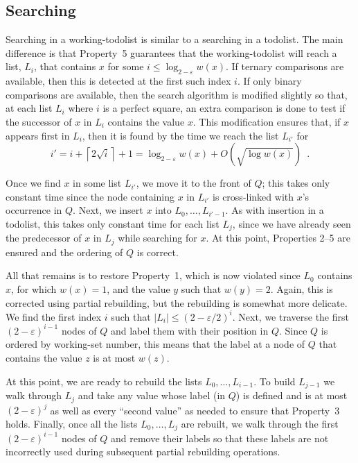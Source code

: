 \documentclass{patmorin}
\newcommand{\eps}{\varepsilon}
\begin{document}
\subsection{Searching}

Searching in a working-todolist is similar to a searching in a todolist.
The main
difference is that Property~5 guarantees that the working-todolist will reach
a list, $L_i$, that contains $x$ for some $i\le\log_{2-\eps} w(x)$.
If ternary comparisons are available, then this is detected at the
first such index $i$.  If only binary comparisons are available, then
the search algorithm is modified slightly so that, at each list $L_i$
where $i$ is a perfect square, an extra comparison is done to test if
the successor of $x$ in $L_i$ contains the value $x$.  This modification
ensures that, if $x$ appears first in $L_i$, then it is found by the
time we reach the list $L_{i'}$ for
\[
     i'=i+\left\lceil 2\sqrt{i}\right\rceil + 1 = \log_{2-\eps} w(x) + O(\sqrt{\log w(x)}) \enspace .
\]

Once we find $x$ in some list $L_{i'}$, we move it to the front of $Q$;
this takes only constant time since the node containing $x$ in $L_{i'}$
is cross-linked with $x$'s occurrence in $Q$.  Next, we insert $x$ into
$L_0,\ldots,L_{i'-1}$.  As with insertion in a todolist, this takes only
constant time for each list $L_j$, since we have already seen the predecessor
of $x$ in $L_j$ while searching for $x$.  
At this point, Properties 2--5 are ensured and the ordering of $Q$ is
correct.  

All that remains is to restore Property~1, which is now violated
since $L_0$ contains $x$, for which $w(x)=1$, and the value $y$ such
that $w(y)=2$.  Again, this is corrected using partial rebuilding,
but the rebuilding is somewhat more delicate.  We find the first index
$i$ such that $|L_i|\le (2-\eps/2)^i$.  Next, we traverse the first
$(2-\eps)^{i-1}$ nodes of $Q$ and label them with their position in $Q$.
Since $Q$ is ordered by working-set number, this means that the label
at a node of $Q$ that contains the value $z$ is at most $w(z)$.

At this point, we are ready to rebuild the lists $L_0,\ldots,L_{i-1}$. To
build $L_{j-1}$ we walk through $L_j$ and take any value whose label
(in $Q$) is defined and is at most $(2-\eps)^j$ as well as every
``second value'' as needed to ensure that Property~3 holds.  Finally,
once all the lists $L_0,\ldots,L_j$ are rebuilt, we walk through the first
$(2-\eps)^{i-1}$ nodes of $Q$ and remove their labels so that these labels
are not incorrectly used during subsequent partial rebuilding operations.
\end{document}
